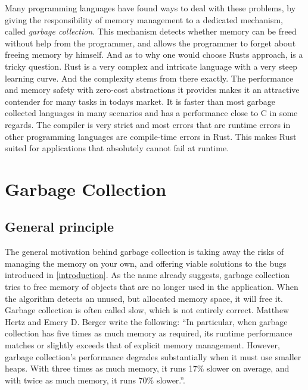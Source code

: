 \documentclass[twocolumn]{article}
\begin{document}
Many programming languages have found ways to deal with these problems, by giving the responsibility of memory management to a dedicated mechanism, called \textit{garbage collection}.
This mechanism detects whether memory can be freed without help from the programmer, and allows the programmer to forget about freeing memory by himself.
And as to why one would choose Rusts approach, is a tricky question.
Rust is a very complex and intricate language with a very steep learning curve.
And the complexity stems from there exactly.
The performance and memory safety with zero-cost abstractions it provides makes it an attractive contender for many tasks in todays market.
It is faster than most garbage collected languages in many scenarios \cite{Benchmark} and has a performance close to C in some regards.
The compiler is very strict and most errors that are runtime errors in other programming languages are compile-time errors in Rust.
This makes Rust suited for applications that absolutely cannot fail at runtime.
\label{introduction}
\section{Garbage Collection}
\subsection{General principle}
The general motivation behind garbage collection is taking away the risks of managing the memory on your own, and offering viable solutions to the bugs introduced in \ref{introduction}.
As the name already suggests, garbage collection tries to free memory of objects that are no longer used in the application.
When the algorithm detects an unused, but allocated memory space, it will free it. 
Garbage collection is often called slow, which is not entirely correct. Matthew Hertz and Emery D. Berger write the following: ``In particular, when garbage collection has five times as much memory as
required, its runtime performance matches or slightly exceeds that of explicit memory management.
However, garbage collection’s performance degrades substantially when it must use smaller heaps. With
three times as much memory, it runs 17\% slower on average, and with twice as much memory, it runs 70\%
slower.''\cite{HertzBerger05}.
\end{document}
